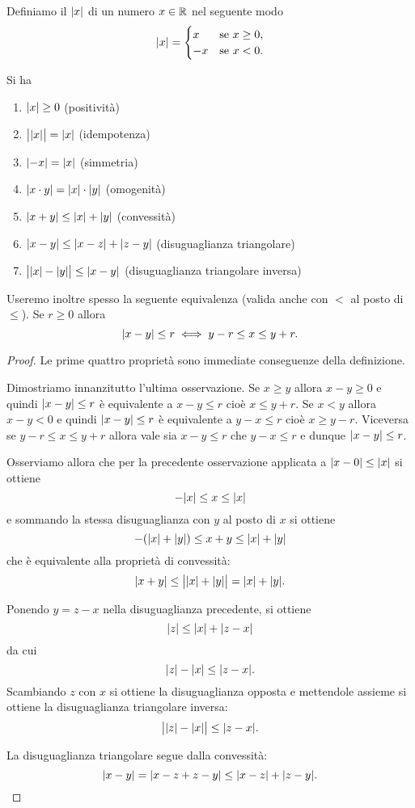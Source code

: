 \begin{definition}
\mymark{***}
Definiamo il  ${\left|x\right|}$ di un numero $x\in \mathbb R$ nel seguente modo
\[
{\left|x\right|} =
\begin{cases}
  x & \text{se $x\ge 0$}, \\
  -x & \text{se $x<0 $}.
\end{cases}
\]
\end{definition}

\begin{proposition}
\mymark{**}
Si ha
\begin{enumerate}
\item ${\left|x\right|}\ge 0$ (positività)
\item $\big\lvert{\left|x\right|}\big\rvert = {\left|x\right|}$ (idempotenza)
\item ${\left|-x\right|} = {\left|x\right|}$ (simmetria)
\item ${\left|x\cdot y\right|} = {\left|x\right|}\cdot {\left|y\right|}$ (omogenità)
\item ${\left|x+y\right|} \le {\left|x\right|} + {\left|y\right|}$ (convessità)
\item ${\left|x-y\right|} \le {\left|x-z\right|} + {\left|z-y\right|}$ (disuguaglianza triangolare)
\item $\big\lvert{\left|x\right|}-{\left|y\right|}\big\rvert \le {\left|x-y\right|}$ (disuguaglianza triangolare inversa)
\end{enumerate}
Useremo inoltre spesso la seguente equivalenza (valida
anche con $<$ al posto di $\le$). Se $r\ge 0$ allora
\[
 {\left|x-y\right|} \le r
 \iff
 y - r \le x \le y + r.
\]
\end{proposition}
%
\begin{proof}
\mymark{*}
Le prime quattro proprietà sono immediate conseguenze della definizione.

Dimostriamo innanzitutto l'ultima osservazione.
Se $x\ge y$ allora $x-y\ge 0$ e quindi ${\left|x-y\right|} \le r$ è
equivalente a $x-y\le r$ cioè $x\le y+r$.
Se $x<y$ allora $x-y<0$ e quindi ${\left|x-y\right|} \le r$ è
equivalente a $y-x \le r$ cioè $x\ge y-r$.
Viceversa se $y-r \le x \le y+r$ allora vale sia $x-y \le r$ che $y-x \le r$ e dunque ${\left|x-y\right|}\le r$.

Osserviamo allora che per la precedente osservazione applicata
a ${\left|x-0\right|} \le {\left|x\right|}$ si ottiene
\[
  -{\left|x\right|} \le x \le {\left|x\right|}
\]
e sommando la stessa disuguaglianza con $y$ al posto di $x$ si
ottiene
\[
  -({\left|x\right|} + {\left|y\right|}) \le x + y \le {\left|x\right|} + {\left|y\right|}
\]
che è equivalente alla proprietà di convessità:
\[
  {\left|x+y\right|} \le \big\lvert{\left|x\right|} + {\left|y\right|}\big\rvert = {\left|x\right|} + {\left|y\right|}.
\]

Ponendo $y=z-x$ nella disuguaglianza precedente, si ottiene
\[
  {\left|z\right|} \le {\left|x\right|} + {\left|z-x\right|}
\]
da cui
\[
  {\left|z\right|} - {\left|x\right|} \le {\left|z-x\right|}.
\]
Scambiando $z$ con $x$ si ottiene la disuguaglianza opposta
e mettendole assieme si ottiene
la disuguaglianza triangolare inversa:
\[
\big\lvert {\left|z\right|}-{\left|x\right|} \big\rvert  \le {\left|z-x\right|}.
\]

La disuguaglianza triangolare segue dalla convessità:
\[
 {\left|x-y\right|} = {\left|x-z + z-y\right|} \le {\left|x-z\right|} + {\left|z-y\right|}.
\]
\end{proof}

